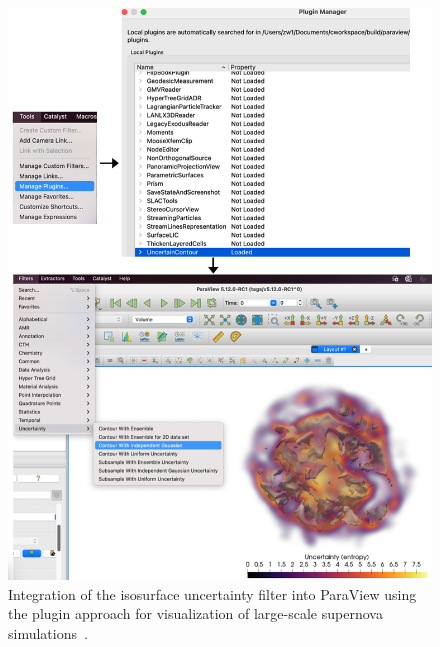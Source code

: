 \begin{figure}[htb]
  \includegraphics[width=\linewidth]{figures/isosurfaceUncertaintyPlugin.png}
  \caption{Integration of the \vtkm isosurface uncertainty filter into ParaView using the plugin approach for visualization of large-scale supernova simulations~\cite{Sandoval2021}.}
  \label{fig:uncertainty-plugin}
\end{figure}



